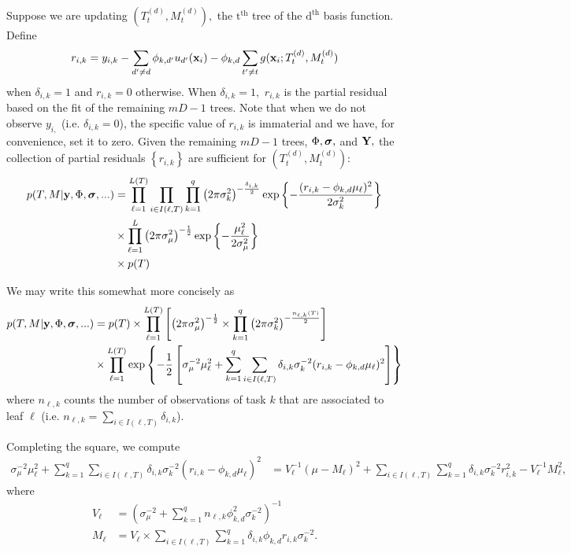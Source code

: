 \documentclass[12pt]{article}
\begin{document}
Suppose we are updating $(T^{(d)}_{t}, M^{(d)}_{t}),$ the $\text{t}^{\text{th}}$ tree of the $\text{d}^{\text{th}}$ basis function.
Define
$$
r_{i,k} = y_{i,k} - \sum_{d' \neq d}{\phi_{k,d'}u_{d'}(\mathbf{x}_{i})} - \phi_{k,d}\sum_{t' \neq t}{g(\mathbf{x}_{i}; T_{t}^{(d)}, M_{t}^{(d)})}
$$
when $\delta_{i,k} = 1$ and $r_{i,k} = 0$ otherwise.
When $\delta_{i,k} = 1,$ $r_{i,k}$ is the partial residual based on the fit of the remaining $mD - 1$ trees.
Note that when we do not observe $y_{i,}$ (i.e. $\delta_{i,k} = 0$), the specific value of $r_{i,k}$ is immaterial and we have, for convenience, set it to zero. 
Given the remaining $mD - 1$ trees, $\Phi, \boldsymbol{\sigma},$ and $\mathbf{Y},$ the collection of partial residuals $\left\{r_{i,k}\right\}$ are sufficient for $(T^{(d)}_{t}, M^{(d)}_{t})$:
\begin{align*}
p(T,M | \mathbf{y}, \Phi, \boldsymbol{\sigma}, ... ) &= \prod_{\ell = 1}^{L(T)}\prod_{i \in I(\ell,T)}\prod_{k = 1}^{q}{\left(2\pi\sigma^{2}_{k}\right)^{-\frac{\delta_{i,k}}{2}}\exp\left\{-\frac{(r_{i,k} - \phi_{k,d}\mu_{\ell})^{2}}{2\sigma^{2}_{k}}\right\}} \\
&\times \prod_{\ell = 1}^{L}{\left(2\pi\sigma^{2}_{\mu}\right)^{-\frac{1}{2}}\exp\left\{-\frac{\mu_{\ell}^{2}}{2\sigma^{2}_{\mu}}\right\}} \\
&\times p(T)
\end{align*}

We may write this somewhat more concisely as
\begin{align*}
p(T,M | \mathbf{y}, \Phi, \boldsymbol{\sigma}, ... ) &= p(T) \times \prod_{\ell = 1}^{L(T)}{\left[\left(2\pi\sigma^{2}_{\mu}\right)^{-\frac{1}{2}} \times  \prod_{k = 1}^{q}{\left(2\pi\sigma^{2}_{k}\right)^{-\frac{n_{\ell,k}(T)}{2}}}\right]} \\
~& \times \prod_{\ell = 1}^{L(T)}{\exp\left\{-\frac{1}{2}\left[\sigma_{\mu}^{-2}\mu_{\ell}^{2} + \sum_{k = 1}^{q}{\sum_{i \in I(\ell,T)}{\delta_{i,k}\sigma^{-2}_{k}(r_{i,k} - \phi_{k,d}\mu_{\ell})^{2}}}\right]\right\}}
\end{align*}
where $n_{\ell,k}$ counts the number of observations of task $k$ that are associated to leaf $\ell$ (i.e. $n_{\ell,k} = \sum_{i \in I(\ell,T)}{\delta_{i,k}}$).

Completing the square, we compute
\begin{align*}
\sigma_{\mu}^{-2}\mu_{\ell}^{2} + \sum_{k = 1}^{q}{\sum_{i \in I(\ell,T)}{\delta_{i,k}\sigma^{-2}_{k}(r_{i,k} - \phi_{k,d}\mu_{\ell})^{2}}} &= V_{\ell}^{-1}(\mu - M_{\ell})^{2} + \sum_{i \in I(\ell,T)}{\sum_{k = 1}^{q}{\delta_{i,k}\sigma^{-2}_{k}r_{i,k}^{2}}} - V_{\ell}^{-1}M_{\ell}^{2},
\end{align*}
where
\begin{align*}
V_{\ell} &= \left(\sigma_{\mu}^{-2} + \sum_{k = 1}^{q}{n_{\ell,k}\phi_{k,d}^{2}\sigma^{-2}_{k}}\right)^{-1} \\
M_{\ell} &= V_{\ell} \times \sum_{i \in I(\ell,T)}{\sum_{k = 1}^{q}{\delta_{i,k}\phi_{k,d}r_{i,k}\sigma^{-2}_{k}}}.
\end{align*}
\end{document}
